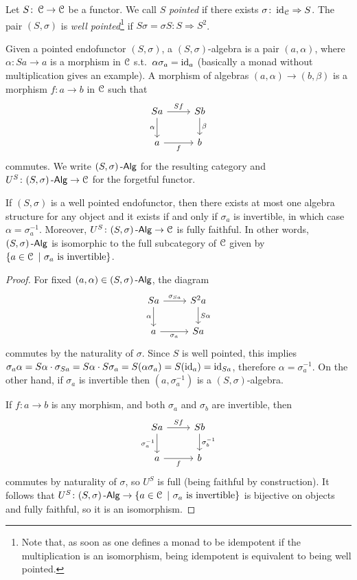 \documentclass[a4paper,11pt,oneside,openany]{scrbook}
\begin{document}
\begin{defn}
	Let $S\colon\operatorname{\mathcal{C}}\to\operatorname{\mathcal{C}}$ be a functor. We call $S$ \emph{pointed} if there exists $\sigma\colon\operatorname{id}_{\operatorname{\mathcal{C}}}\Rightarrow S$. The pair $(S,\sigma)$ is \emph{well pointed}\footnote{Note that, as soon as one defines a monad to be idempotent if the multiplication is an isomorphism, being idempotent is equivalent to being well pointed.} if $S\sigma=\sigma S\colon S\Rightarrow S^2$.
\end{defn}
\begin{defn}
	Given a pointed endofunctor $(S,\sigma)$, a $(S,\sigma)$-algebra is a pair $(a,\alpha)$, where $\alpha\colon Sa\to a$ is a morphism in $\operatorname{\mathcal{C}}$ s.t.\ $\alpha\sigma_a=\operatorname{id}_a$ (basically a monad without multiplication gives an example). A morphism of algebras $(a,\alpha)\to(b,\beta)$ is a morphism $f\colon a\to b$ in $\operatorname{\mathcal{C}}$ such that
	\[
		\begin{tikzcd}
			Sa\arrow["\alpha"']{d}\arrow["Sf"]{r}
			& Sb\arrow["\beta"]{d} \\
			a\arrow["f"']{r}
			& b
		\end{tikzcd}
	\]
	commutes. We write $(S,\sigma)\operatorname{-\mathsf{Alg}}$ for the resulting category and $U^S\colon(S,\sigma)\operatorname{-\mathsf{Alg}}\to\operatorname{\mathcal{C}}$ for the forgetful functor.
\end{defn}
\begin{lemma}
	If $(S,\sigma)$ is a well pointed endofunctor, then there exists at most one algebra structure for any object and it exists if and only if $\sigma_a$ is invertible, in which case $\alpha=\sigma_a^{-1}$. Moreover, $U^S\colon(S,\sigma)\operatorname{-\mathsf{Alg}}\to\operatorname{\mathcal{C}}$ is fully faithful. In other words, $(S,\sigma)\operatorname{-\mathsf{Alg}}$ is isomorphic to the full subcategory of $\operatorname{\mathcal{C}}$ given by $\{a\in\operatorname{\mathcal{C}}\ |\ \sigma_a \ \text{is invertible} \}$.
\end{lemma}
\begin{proof}
	For fixed $(a,\alpha)\in(S,\sigma)\operatorname{-\mathsf{Alg}}$, the diagram
	\[
		\begin{tikzcd}
			Sa\arrow["\alpha"']{d}\arrow["\sigma_{Sa}"]{r}
			& S^2a\arrow["S\alpha"]{d} \\
			a\arrow["\sigma_a"']{r}
			& Sa
		\end{tikzcd}
	\]
	commutes by the naturality of $\sigma$. Since $S$ is well pointed, this implies $\sigma_a \alpha=S\alpha\cdot\sigma_{Sa}=S\alpha\cdot S\sigma_a=S(\alpha\sigma_a)=S(\operatorname{id}_a)=\operatorname{id}_{Sa}$, therefore $\alpha=\sigma_a^{-1}$. On the other hand, if $\sigma_a$ is invertible then $(a,\sigma_a^{-1})$ is a $(S,\sigma)$-algebra.

	If $f\colon a\to b$ is any morphism, and both $\sigma_a$ and $\sigma_b$ are invertible, then
	\[
		\begin{tikzcd}
			Sa\arrow["\sigma_a^{-1}"']{d}\arrow["Sf"]{r}
			& Sb\arrow["\sigma_b^{-1}"]{d} \\
			a\arrow["f"']{r}
			& b
		\end{tikzcd}
	\]
	commutes by naturality of $\sigma$, so $U^S$ is full (being faithful by construction). It follows that $U^S\colon(S,\sigma)\Alg\to\{a\in\C\ |\ \sigma_a \ \text{is invertible}\}$ is bijective on objects and fully faithful, so it is an isomorphism.
\end{proof}
\end{document}
